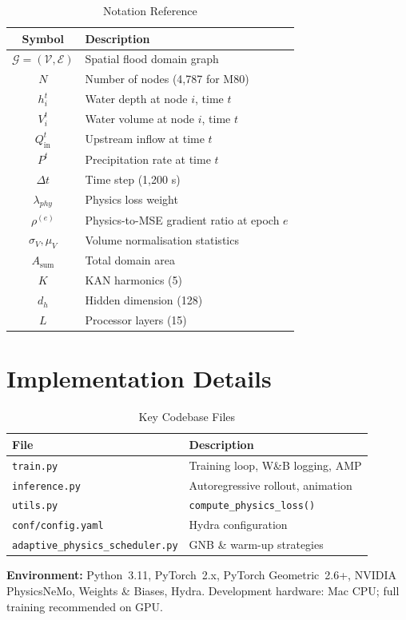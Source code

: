 \documentclass[conference]{IEEEtran}
\begin{document}
\begin{table}[htbp]
\caption{Notation Reference}
\label{tab:notation}
\centering
\begin{tabular}{cl}
\toprule
\textbf{Symbol} & \textbf{Description} \\
\midrule
$\mathcal{G}=(\mathcal{V},\mathcal{E})$ & Spatial flood domain graph \\
$N$        & Number of nodes (4,787 for M80) \\
$h_i^t$    & Water depth at node $i$, time $t$ \\
$V_i^t$    & Water volume at node $i$, time $t$ \\
$Q_{\text{in}}^t$ & Upstream inflow at time $t$ \\
$P^t$      & Precipitation rate at time $t$ \\
$\Delta t$ & Time step (1,200 s) \\
$\lambda_{phy}$ & Physics loss weight \\
$\rho^{(e)}$ & Physics-to-MSE gradient ratio at epoch $e$ \\
$\sigma_V,\mu_V$ & Volume normalisation statistics \\
$A_{\text{sum}}$ & Total domain area \\
$K$        & KAN harmonics (5) \\
$d_h$      & Hidden dimension (128) \\
$L$        & Processor layers (15) \\
\bottomrule
\end{tabular}
\end{table}

\section{Implementation Details}
\label{app:impl}

\begin{table}[htbp]
\caption{Key Codebase Files}
\label{tab:impl}
\centering
\begin{tabular}{ll}
\toprule
\textbf{File} & \textbf{Description} \\
\midrule
\texttt{train.py}        & Training loop, W\&B logging, AMP \\
\texttt{inference.py}    & Autoregressive rollout, animation \\
\texttt{utils.py}        & \texttt{compute\_physics\_loss()} \\
\texttt{conf/config.yaml}& Hydra configuration \\
\texttt{adaptive\_physics\_scheduler.py} & GNB \& warm-up strategies \\
\bottomrule
\end{tabular}
\end{table}

\noindent\textbf{Environment:} Python~3.11, PyTorch~2.x, PyTorch
Geometric~2.6+, NVIDIA PhysicsNeMo, Weights \& Biases, Hydra.
Development hardware: Mac CPU; full training recommended on GPU.
\end{document}
